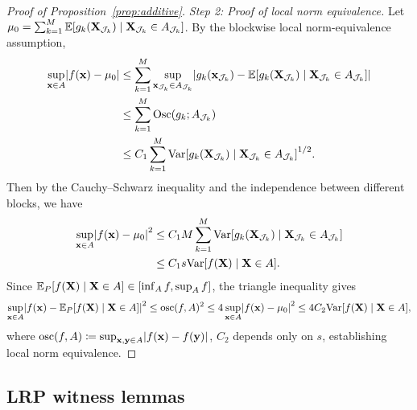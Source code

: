 \documentclass[11pt]{article}
\theoremstyle{plain}
\theoremstyle{definition}
\theoremstyle{remark}
\theoremstyle{plain}
\newcommand{\bx}{\mathbf{x}}
\newcommand{\by}{\mathbf{y}}
\newcommand{\bX}{\mathbf{X}}
\DeclarePairedDelimiter{\bracks}{[}{]}
\DeclarePairedDelimiter{\abs}{|}{|}
\newcommand{\E}{\mathbb{E}}
\newcommand{\Var}{\textnormal{Var}}
\newcommand{\1}{\mathbbm{1}}
\begin{document}
\begin{proof}[Proof of Proposition~\ref{prop:additive}]
    \textit{Step 2: Proof of local norm equivalence.} Let $\mu_0 = \sum_{k=1}^M \E\bracks*{g_k(\bX_{\mathcal{J}_k}) \mid \bX_{\mathcal{J}_k} \in A_{\mathcal{J}_k}}$. By the blockwise local norm-equivalence assumption,
    \begin{equation}
    \begin{aligned}
        \sup_{\bx \in A} \abs*{f(\bx) - \mu_0}
        &\leq \sum_{k=1}^M \sup_{\bx_{\mathcal{J}_k} \in A_{\mathcal{J}_k}}\abs*{g_k(\bx_{\mathcal{J}_k}) - \E\bracks*{g_k(\bX_{\mathcal{J}_k}) \mid \bX_{\mathcal{J}_k} \in A_{\mathcal{J}_k}}} \\
        &\leq \sum_{k=1}^M \operatorname{Osc}(g_k;A_{\mathcal{J}_k})\\
        &\leq C_1 \sum_{k=1}^M \Var\bracks*{g_k(\bX_{\mathcal{J}_k}) \mid \bX_{\mathcal{J}_k} \in A_{\mathcal{J}_k}}^{1/2}.
    \end{aligned}
    \end{equation}
    Then by the Cauchy--Schwarz inequality and the independence between different blocks, we have
    \begin{equation}
        \begin{split}
            \sup_{\bx \in A} \abs*{f(\bx) - \mu_0}^2
            &\leq C_1 M \sum_{k=1}^M \Var\bracks*{g_k(\bX_{\mathcal{J}_k}) \mid \bX_{\mathcal{J}_k} \in A_{\mathcal{J}_k}} \\
            &\leq C_1 s \Var\bracks*{f(\bX) \mid \bX \in A}.
        \end{split}
    \end{equation}
    Since $\E_P\bracks*{f(\bX) \mid \bX \in A} \in [\inf_A f, \sup_A f]$, the triangle inequality gives
    \begin{equation}
        \sup_{\bx \in A} \abs*{f(\bx) - \E_P\bracks*{f(\bX) \mid \bX \in A}}^2 \leq \operatorname{osc}(f, A)^2 \leq 4 \sup_{\bx \in A} \abs*{f(\bx) - \mu_0}^2 \leq 4 C_2 \Var\bracks*{f(\bX) \mid \bX \in A},
    \end{equation}
    where $\operatorname{osc}(f, A) \coloneqq \sup_{\bx, \by \in A} \abs*{f(\bx) - f(\by)}$, $C_2$ depends only on $s$, establishing local norm equivalence.
\end{proof}


\subsection{LRP witness lemmas}
\end{document}
